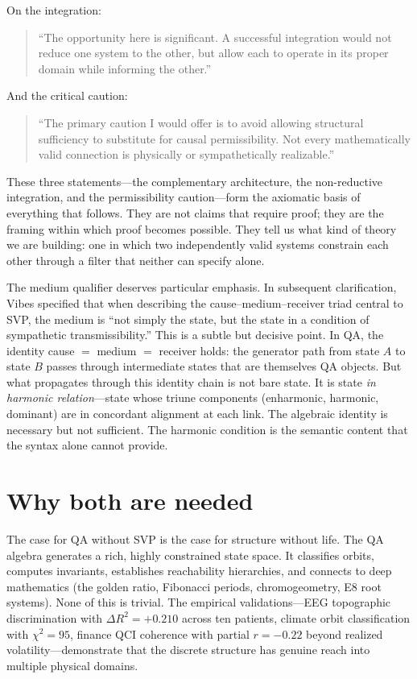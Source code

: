 \documentclass[11pt,a4paper]{article}
\begin{document}
On the integration:

\begin{quote}
``The opportunity here is significant. A successful integration would not
reduce one system to the other, but allow each to operate in its proper
domain while informing the other.''
\end{quote}

And the critical caution:

\begin{quote}
``The primary caution I would offer is to avoid allowing structural
sufficiency to substitute for causal permissibility. Not every
mathematically valid connection is physically or sympathetically
realizable.''
\end{quote}

These three statements---the complementary architecture, the
non-reductive integration, and the permissibility caution---form the
axiomatic basis of everything that follows. They are not claims that
require proof; they are the framing within which proof becomes possible.
They tell us what kind of theory we are building: one in which two
independently valid systems constrain each other through a filter that
neither can specify alone.

The medium qualifier deserves particular emphasis. In subsequent
clarification, Vibes specified that when describing the
cause--medium--receiver triad central to SVP, the medium is ``not simply
the state, but the state in a condition of sympathetic
transmissibility.'' This is a subtle but decisive point. In QA, the
identity cause $=$ medium $=$ receiver holds: the generator path from
state $A$ to state $B$ passes through intermediate states that are
themselves QA objects. But what propagates through this identity chain is
not bare state. It is state \emph{in harmonic relation}---state whose
triune components (enharmonic, harmonic, dominant) are in concordant
alignment at each link. The algebraic identity is necessary but not
sufficient. The harmonic condition is the semantic content that the
syntax alone cannot provide.

\section{Why both are needed}

The case for QA without SVP is the case for structure without life. The
QA algebra generates a rich, highly constrained state space. It classifies
orbits, computes invariants, establishes reachability hierarchies, and
connects to deep mathematics (the golden ratio, Fibonacci periods,
chromogeometry, E8 root systems). None of this is trivial. The empirical
validations---EEG topographic discrimination with $\Delta R^2 = +0.210$
across ten patients, climate orbit classification with $\chi^2 = 95$,
finance QCI coherence with partial $r = -0.22$ beyond realized
volatility---demonstrate that the discrete structure has genuine reach
into multiple physical domains.
\end{document}

